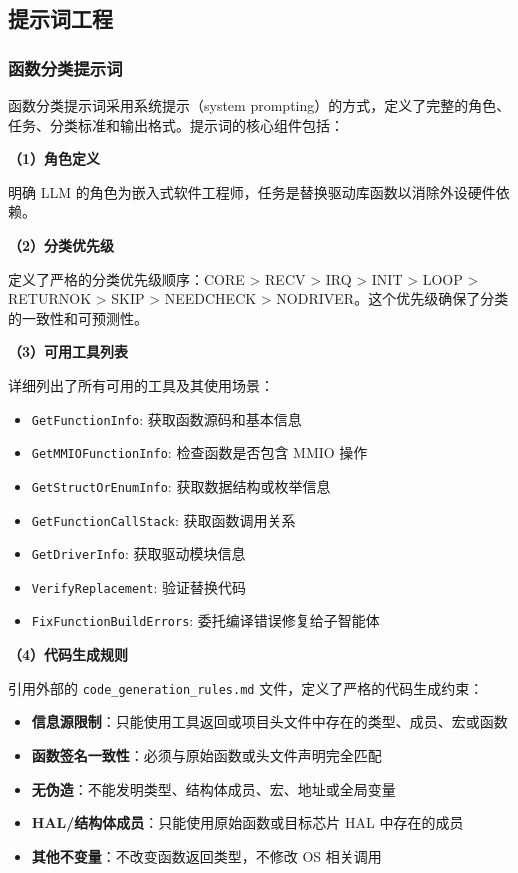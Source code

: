 \subsection{提示词工程}

\subsubsection{函数分类提示词}

函数分类提示词采用系统提示（system prompting）的方式，定义了完整的角色、任务、分类标准和输出格式。提示词的核心组件包括：

\textbf{（1）角色定义}

明确 LLM 的角色为嵌入式软件工程师，任务是替换驱动库函数以消除外设硬件依赖。

\textbf{（2）分类优先级}

定义了严格的分类优先级顺序：CORE > RECV > IRQ > INIT > LOOP > RETURNOK > SKIP > NEEDCHECK > NODRIVER。这个优先级确保了分类的一致性和可预测性。

\textbf{（3）可用工具列表}

详细列出了所有可用的工具及其使用场景：
\begin{itemize}
    \item \texttt{GetFunctionInfo}: 获取函数源码和基本信息
    \item \texttt{GetMMIOFunctionInfo}: 检查函数是否包含 MMIO 操作
    \item \texttt{GetStructOrEnumInfo}: 获取数据结构或枚举信息
    \item \texttt{GetFunctionCallStack}: 获取函数调用关系
    \item \texttt{GetDriverInfo}: 获取驱动模块信息
    \item \texttt{VerifyReplacement}: 验证替换代码
    \item \texttt{FixFunctionBuildErrors}: 委托编译错误修复给子智能体
\end{itemize}

\textbf{（4）代码生成规则}

引用外部的 \texttt{code\_generation\_rules.md} 文件，定义了严格的代码生成约束：

\begin{itemize}
    \item \textbf{信息源限制}：只能使用工具返回或项目头文件中存在的类型、成员、宏或函数
    \item \textbf{函数签名一致性}：必须与原始函数或头文件声明完全匹配
    \item \textbf{无伪造}：不能发明类型、结构体成员、宏、地址或全局变量
    \item \textbf{HAL/结构体成员}：只能使用原始函数或目标芯片 HAL 中存在的成员
    \item \textbf{其他不变量}：不改变函数返回类型，不修改 OS 相关调用
\end{itemize}

